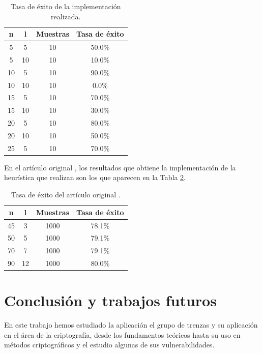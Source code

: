 \documentclass[12pt]{book}
\theoremstyle{definition}
\begin{document}
\begin{table}[h]
\centering
\begin{tabular}{|c|c|c|c|}
\hline
n  & l  & Muestras & Tasa de éxito \\ \hline
5 & 5  & 10     & 50.0\%        \\ \hline
5 & 10  & 10     & 10.0\%        \\ \hline
10 & 5  & 10     & 90.0\%        \\ \hline
10 & 10 & 10     & 0.0\%        \\ \hline
15 & 5  & 10     & 70.0\%        \\ \hline
15 & 10  & 10     & 30.0\%        \\ \hline
20 & 5  & 10     & 80.0\%        \\ \hline
20 & 10 & 10     & 50.0\%        \\ \hline
25 & 5  & 10     & 70.0\%        \\ \hline
\end{tabular}
\caption{Tasa de éxito de la implementación realizada.}
\label{tab:ex-pr}
\end{table}



En el artículo original \cite{Att}, los resultados que obtiene la implementación de la heurística que realizan son los que aparecen en la Tabla \ref{tab:ex-or}. 

\begin{table}[h]
\centering
\begin{tabular}{|c|c|c|c|}
\hline
n  & l  & Muestras & Tasa de éxito \\ \hline
45 & 3  & 1000     & 78.1\%        \\ \hline
50 & 5  & 1000     & 79.1\%        \\ \hline
70 & 7  & 1000     & 79.1\%        \\ \hline
90 & 12 & 1000     & 80.0\%        \\ \hline
\end{tabular}
\caption{Tasa de éxito del artículo original \cite{Att}.}
\label{tab:ex-or}
\end{table}

\chapter{Conclusión y trabajos futuros}
En este trabajo hemos estudiado la aplicación el grupo de trenzas y su aplicación en el área de la criptografía, desde los fundamentos teóricos hasta su uso en métodos criptográficos y el estudio algunas de sus vulnerabilidades.
\end{document}
